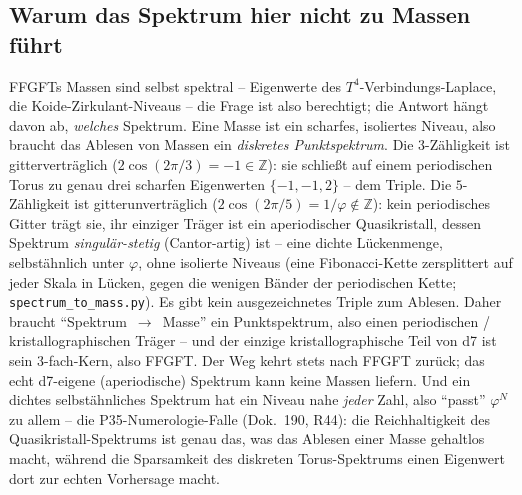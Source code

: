 \subsection{Warum das Spektrum hier nicht zu Massen f\"uhrt}
FFGFTs Massen sind selbst spektral -- Eigenwerte des $T^4$-Verbindungs-Laplace, die
Koide-Zirkulant-Niveaus -- die Frage ist also berechtigt; die Antwort h\"angt davon ab,
\emph{welches} Spektrum. Eine Masse ist ein scharfes, isoliertes Niveau, also braucht das
Ablesen von Massen ein \emph{diskretes Punktspektrum}. Die $3$-Z\"ahligkeit ist
gittervertr\"aglich ($2\cos(2\pi/3)=-1\in\mathbb{Z}$): sie schlie\ss t auf einem periodischen
Torus zu genau drei scharfen Eigenwerten $\{-1,-1,2\}$ -- dem Triple. Die $5$-Z\"ahligkeit ist
gitterun\-vertr\"aglich ($2\cos(2\pi/5)=1/\varphi\notin\mathbb{Z}$): kein periodisches Gitter
tr\"agt sie, ihr einziger Tr\"ager ist ein aperiodischer Quasikristall, dessen Spektrum
\emph{singul\"ar-stetig} (Cantor-artig) ist -- eine dichte L\"uckenmenge, selbst\"ahnlich unter
$\varphi$, ohne isolierte Niveaus (eine Fibonacci-Kette zersplittert auf jeder Skala in
L\"ucken, gegen die wenigen B\"ander der periodischen Kette; \texttt{spectrum\_to\_mass.py}).
Es gibt kein ausgezeichnetes Triple zum Ablesen. Daher braucht \enquote{Spektrum~$\to$~Masse}
ein Punktspektrum, also einen periodischen / kristallographischen Tr\"ager -- und der einzige
kristallographische Teil von d7 ist sein $3$-fach-Kern, also FFGFT. Der Weg kehrt stets nach
FFGFT zur\"uck; das echt d7-eigene (aperiodische) Spektrum kann keine Massen liefern. Und ein
dichtes selbst\"ahnliches Spektrum hat ein Niveau nahe \emph{jeder} Zahl, also \enquote{passt}
$\varphi^N$ zu allem -- die P35-Numerologie-Falle (Dok.~190, R44): die Reichhaltigkeit des
Quasikristall-Spektrums ist genau das, was das Ablesen einer Masse gehaltlos macht, w\"ahrend
die Sparsamkeit des diskreten Torus-Spektrums einen Eigenwert dort zur echten Vorhersage macht.

